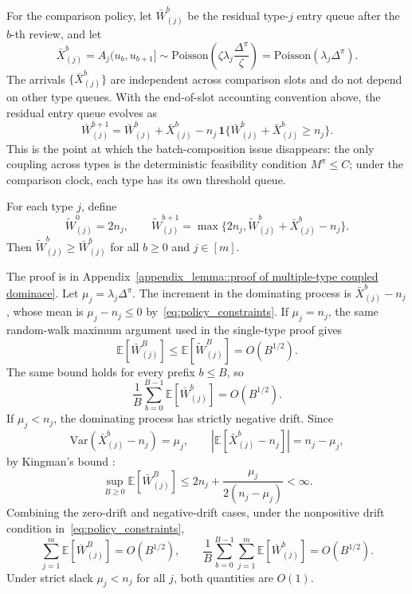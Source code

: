 For the comparison policy, let \(\bar W^b_{(j)}\) be the residual type-\(j\) entry queue after the \(b\)-th review, and let
\[
    \bar X^b_{(j)}
    =A_j(u_b,u_{b+1}]
    \sim \text{Poisson}\!\left(\zeta\lambda_j\frac{\Delta^\pi}{\zeta}\right)
    =\text{Poisson}(\lambda_j\Delta^\pi).
\]
The arrivals \(\{\bar X^b_{(j)}\}\) are independent across comparison slots and do not depend on other type queues. With the end-of-slot accounting convention above, the residual entry queue evolves as
\[
    \bar W^{b+1}_{(j)}
    =
    \bar W^b_{(j)}+\bar X^b_{(j)}
    -
    n_j\,\mathbf{1}\{\bar W^b_{(j)}+\bar X^b_{(j)}\ge n_j\}.
\]
This is the point at which the batch-composition issue disappears: the only coupling across types is the deterministic feasibility condition \(M^\pi\le C\); under the comparison clock, each type has its own threshold queue.

\begin{lemma}\label{lemma::multiple-type coupled dominace}
For each type \(j\), define
\[
\widetilde W_{(j)}^0=2n_j,\qquad
\widetilde W_{(j)}^{b+1}
=\max\{2n_j,\widetilde W_{(j)}^b+\bar X^b_{(j)}-n_j\}.
\]
Then \(\widetilde W^b_{(j)}\ge \bar W^b_{(j)}\) for all \(b\ge0\) and \(j\in[m]\).
\end{lemma}
\noindent The proof is in Appendix~\ref{appendix_lemma::proof of multiple-type coupled dominace}. Let \(\mu_j=\lambda_j\Delta^\pi\). The increment in the dominating process is \(\bar X^b_{(j)}-n_j\), whose mean is \(\mu_j-n_j\le0\) by~\eqref{eq:policy_constraints}. If \(\mu_j=n_j\), the same random-walk maximum argument used in the single-type proof gives
\[
    \mathbb{E}[\bar W^B_{(j)}]
    \le \mathbb{E}[\widetilde W^B_{(j)}]
    =O(B^{1/2}).
\]
The same bound holds for every prefix \(b\le B\), so
\[
    \frac{1}{B}\sum_{b=0}^{B-1}\mathbb{E}[\bar W^b_{(j)}]=O(B^{1/2}).
\]
If \(\mu_j<n_j\), the dominating process has strictly negative drift. Since
\[
\text{Var}(\bar X^b_{(j)}-n_j)=\mu_j,\qquad
\left|\mathbb{E}[\bar X^b_{(j)}-n_j]\right|=n_j-\mu_j,
\]
by Kingman's bound \citep{kingman1962queues}:
\[
    \sup_{B\ge0}\mathbb{E}[\bar W^B_{(j)}]
    \le
    2n_j+\frac{\mu_j}{2(n_j-\mu_j)}
    <\infty .
\]
Combining the zero-drift and negative-drift cases, under the nonpositive drift condition in~\eqref{eq:policy_constraints},
\[
    \sum_{j=1}^m \mathbb{E}[\bar W^B_{(j)}]=O(B^{1/2}),
    \qquad
    \frac{1}{B}\sum_{b=0}^{B-1}\sum_{j=1}^m \mathbb{E}[\bar W^b_{(j)}]=O(B^{1/2}).
\]
Under strict slack \(\mu_j<n_j\) for all \(j\), both quantities are \(O(1)\).

